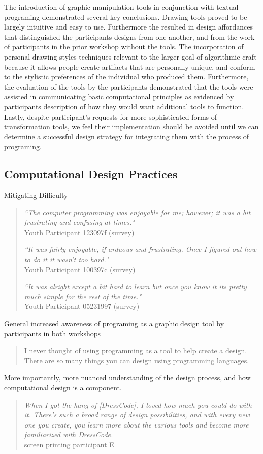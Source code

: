 \documentclass{sigchi}
\begin{document}
The introduction of graphic manipulation tools in conjunction with textual programing demonstrated several key conclusions. Drawing tools proved to be largely intuitive and easy to use. Furthermore the resulted in design affordances that distinguished the participants designs from one another, and from the work of participants in the prior workshop without the tools. The incorporation of personal drawing styles techniques relevant to the larger goal of algorithmic craft because it allows people create artifacts that are personally unique, and conform to the stylistic preferences of the individual who produced them. Furthermore, the evaluation of the tools by the participants demonstrated that the tools were assisted in communicating basic computational principles as evidenced by participants description of how they would want additional tools to function. Lastly, despite participant's requests for more sophisticated forms of transformation tools, we feel their implementation should be avoided until we can determine a successful design strategy for integrating them with the process of programing. 

\subsection{Computational Design Practices}
Mitigating Difficulty
\begin{quotation}
\textit{``The computer programming was enjoyable for me; however; it was a bit frustrating and confusing at times."}
\\Youth Participant 123097f (survey)

\textit{``It was fairly enjoyable, if arduous and frustrating. Once I figured out how to do it it wasn't too hard."}
\\Youth Participant 100397c (survey)

\textit{``It was alright except a bit hard to learn but once you know it its pretty much simple for the rest of the time."}
\\Youth Participant 05231997 (survey)
\end{quotation}
General increased awareness of programing as a graphic design tool by participants in both workshops
\begin{quotation}
	I never thought of using programming as a tool to help create a design. There are so many things you can design using programming languages.
\end{quotation}

More importantly, more nuanced understanding of the design process, and how computational design is a component.
\begin{quotation}
	\textit{When I got the hang of [DressCode], I loved how much you could do with it. There's such a broad range of design possibilities, and with every new one you create, you learn more about the various tools and become more familiarized with DressCode.}
	\\screen printing participant E
\end{quotation}
\end{document}
